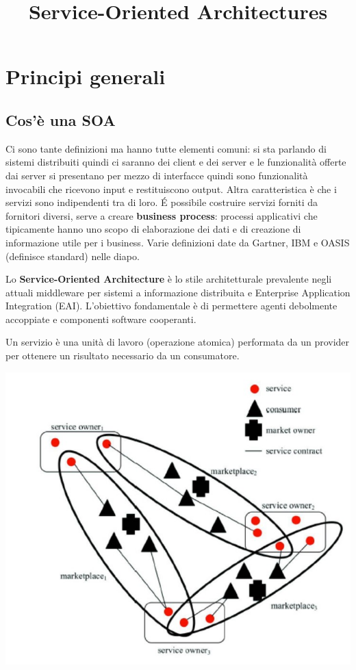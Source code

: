 \title{Service-Oriented Architectures}
\maketitle


\chapter{Principi generali}
\section{Cos'è una SOA}
Ci sono tante definizioni ma hanno tutte elementi comuni: si sta parlando di sistemi distribuiti quindi ci saranno dei client e dei server e le funzionalità offerte dai server si presentano per mezzo di interfacce quindi sono funzionalità invocabili che ricevono input e restituiscono output. Altra caratteristica è che i servizi sono indipendenti tra di loro. \'E possibile costruire servizi forniti da fornitori diversi, serve a creare \textbf{business process}: processi applicativi che tipicamente hanno uno scopo di elaborazione dei dati e di creazione di informazione utile per i business. 
Varie definizioni date da Gartner, IBM e OASIS (definisce standard) nelle diapo. 
\begin{multicols}{2}
Lo \textbf{Service-Oriented Architecture} è lo stile architetturale prevalente negli attuali middleware per sistemi a informazione distribuita e Enterprise Application Integration (EAI). L'obiettivo fondamentale è di permettere agenti debolmente accoppiate e componenti software cooperanti. 

Un servizio è una unità di lavoro (operazione atomica) performata da un provider per ottenere un risultato necessario da un consumatore.
\begin{center}
    \includegraphics[scale = 0.4]{Images/SOA/WhatIsASOA.jpg}
\end{center}
\end{multicols}

